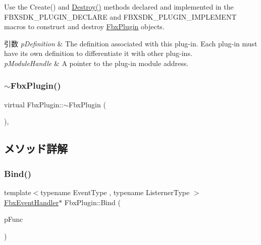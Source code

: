 Use the Create() and \hyperlink{class_fbx_plugin_a0a3b33c932cc862e539cef85d168b86a}{Destroy()} methods declared and implemented in the F\+B\+X\+S\+D\+K\+\_\+\+P\+L\+U\+G\+I\+N\+\_\+\+D\+E\+C\+L\+A\+RE and F\+B\+X\+S\+D\+K\+\_\+\+P\+L\+U\+G\+I\+N\+\_\+\+I\+M\+P\+L\+E\+M\+E\+NT macros to construct and destroy \hyperlink{class_fbx_plugin}{Fbx\+Plugin} objects. 
\begin{DoxyParams}{引数}
{\em p\+Definition} & The definition associated with this plug-\/in. Each plug-\/in must have its own definition to differentiate it with other plug-\/ins. \\
\hline
{\em p\+Module\+Handle} & A pointer to the plug-\/in module address. \\
\hline
\end{DoxyParams}
\mbox{\label{class_fbx_plugin_ae1d45c36d20e8174fdfe3985a9e0e2d3}} 
\subsubsection{\texorpdfstring{$\sim$\+Fbx\+Plugin()}{~FbxPlugin()}}
{\footnotesize\ttfamily virtual Fbx\+Plugin\+::$\sim$\+Fbx\+Plugin (\begin{DoxyParamCaption}{ }\end{DoxyParamCaption})\hspace{0.3cm}{\ttfamily [protected]}, {\ttfamily [virtual]}}



\subsection{メソッド詳解}
\mbox{\label{class_fbx_plugin_aafd653e6999de489d8e1c00fa9956ed0}} 
\subsubsection{\texorpdfstring{Bind()}{Bind()}}
{\footnotesize\ttfamily template$<$typename Event\+Type , typename Listerner\+Type $>$ \\
\hyperlink{class_fbx_event_handler}{Fbx\+Event\+Handler}$\ast$ Fbx\+Plugin\+::\+Bind (\begin{DoxyParamCaption}\item[{void(Listerner\+Type\+::$\ast$)(const Event\+Type $\ast$)}]{p\+Func }\end{DoxyParamCaption})}

